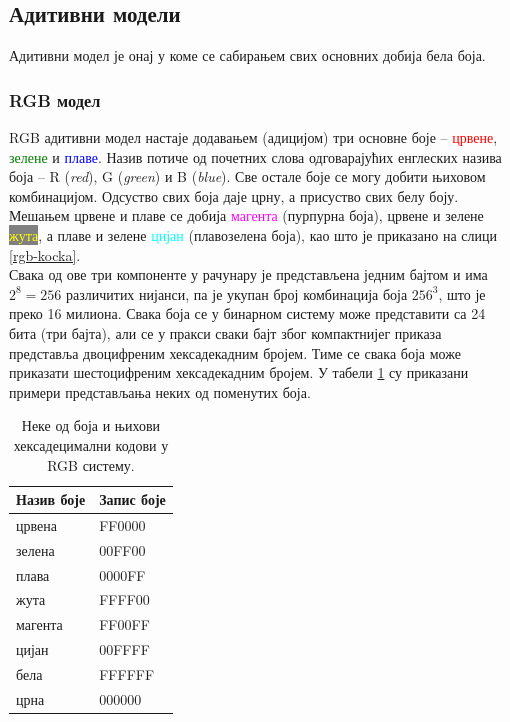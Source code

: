 \documentclass[A4, 11pt]{article}
\begin{document}
\subsection{Адитивни модели}
Адитивни модел је онај у коме се сабирањем свих основних добија бела боја.

\subsubsection{RGB модел}
\noindent RGB адитивни модел настаје додавањем (адицијом) три основне боје – \textcolor{red}{црвене}, \textcolor{green}{зелене} и \textcolor{blue}{плаве}. Назив потиче од почетних слова одговарајућих енглеских назива боја – R (\textit{red}), G (\textit{green}) и B (\textit{blue}). Све остале боје се могу добити њиховом комбинацијом.
Одсуство свих боја даје црну, а присуство свих белу боју. Мешањем црвене и плаве се добија \textcolor{magenta}{магента} (пурпурна боја), црвене и зелене \colorbox{gray}{\textcolor{yellow}{жута}}, а плаве и зелене \textcolor{cyan}{цијан} (плавозелена
боја), као што је приказано на слици \ref{rgb-kocka}.
\\ Свака од ове три компоненте у рачунару је представљена једним бајтом и има $2^8 = 256$ различитих нијанси, па је укупан број комбинација боја $256^3$, што је преко 16 милиона. Свака боја се у бинарном систему може представити са 24 бита (три бајта), али се у пракси сваки бајт због компактнијег приказа представља двоцифреним хексадекадним бројем. Тиме се свака боја може приказати шестоцифреним хексадекадним бројем. У табели \ref{rgb-tabela} су приказани примери представљања неких од поменутих боја.

\begin{table}[!h]
\centering
\begin{tabular}{|l|l|}
\hline
{\color[HTML]{000000} Назив боје} & {\color[HTML]{000000} Запис боје} \\ \hline
\rowcolor[HTML]{FE0000} 
{\color[HTML]{000000} црвена}     & {\color[HTML]{000000} FF0000}     \\ \hline
\rowcolor[HTML]{00FF00} 
{\color[HTML]{000000} зелена}     & {\color[HTML]{000000} 00FF00}     \\ \hline
\rowcolor[HTML]{0000FF} 
{\color[HTML]{FFFFFF} плава}      & {\color[HTML]{FFFFFF} 0000FF}     \\ \hline
\rowcolor[HTML]{FFFF00} 
{\color[HTML]{000000} жута}       & {\color[HTML]{000000} FFFF00}     \\ \hline
\rowcolor[HTML]{FF00FF} 
{\color[HTML]{000000} магента}    & {\color[HTML]{000000} FF00FF}     \\ \hline
\rowcolor[HTML]{00FFFF} 
{\color[HTML]{000000} цијан}      & {\color[HTML]{000000} 00FFFF}     \\ \hline
\rowcolor[HTML]{FFFFFF} 
{\color[HTML]{000000} бела}       & FFFFFF                            \\ \hline
\rowcolor[HTML]{000000} 
{\color[HTML]{FFFFFF} црна}       & {\color[HTML]{FFFFFF} 000000}     \\ \hline
\end{tabular}
\caption{Неке од боја и њихови хексадецимални кодови у RGB систему.}
\label{rgb-tabela}
\end{table}
\end{document}
